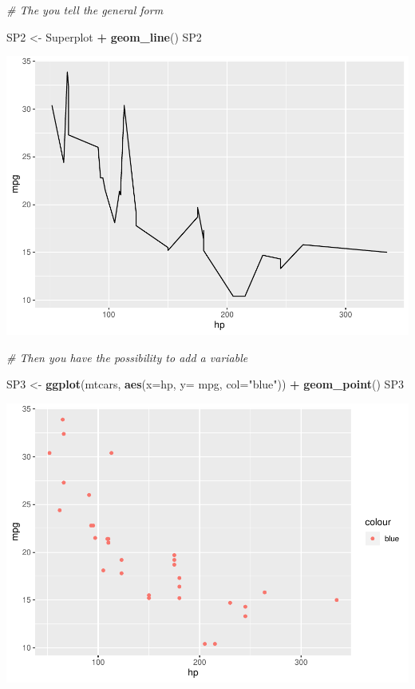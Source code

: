 \documentclass[]{report}
\newenvironment{Shaded}{\begin{snugshade}}{\end{snugshade}}
\newcommand{\KeywordTok}[1]{\textcolor[rgb]{0.13,0.29,0.53}{\textbf{#1}}}
\newcommand{\DataTypeTok}[1]{\textcolor[rgb]{0.13,0.29,0.53}{#1}}
\newcommand{\StringTok}[1]{\textcolor[rgb]{0.31,0.60,0.02}{#1}}
\newcommand{\CommentTok}[1]{\textcolor[rgb]{0.56,0.35,0.01}{\textit{#1}}}
\newcommand{\OperatorTok}[1]{\textcolor[rgb]{0.81,0.36,0.00}{\textbf{#1}}}
\newcommand{\NormalTok}[1]{#1}
\begin{document}
\begin{Shaded}
\begin{Highlighting}[]
\CommentTok{# The you tell the general form}

\NormalTok{SP2 <-}\StringTok{ }\NormalTok{Superplot }\OperatorTok{+}\StringTok{ }
\StringTok{      }\KeywordTok{geom_line}\NormalTok{()  }
\NormalTok{SP2}
\end{Highlighting}
\end{Shaded}

\includegraphics{MyBook_files/figure-latex/unnamed-chunk-69-2.pdf}

\begin{Shaded}
\begin{Highlighting}[]
\CommentTok{# Then you have the possibility to add a variable}

\NormalTok{SP3 <-}\StringTok{ }\KeywordTok{ggplot}\NormalTok{(mtcars, }\KeywordTok{aes}\NormalTok{(}\DataTypeTok{x=}\NormalTok{hp, }\DataTypeTok{y=}\NormalTok{ mpg, }\DataTypeTok{col=}\StringTok{"blue"}\NormalTok{)) }\OperatorTok{+}
\StringTok{      }\KeywordTok{geom_point}\NormalTok{()}
\NormalTok{SP3}
\end{Highlighting}
\end{Shaded}

\includegraphics{MyBook_files/figure-latex/unnamed-chunk-69-3.pdf}
\end{document}
